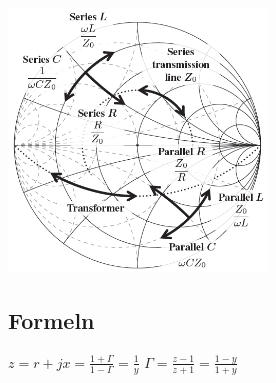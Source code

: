	\\
	\includegraphics[height=7cm]{./bilder/smith_anpassung.png}
	
\subsection{Formeln}
	$z=r+jx=\frac{1+\Gamma}{1-\Gamma}=\frac{1}{y}$ \qquad
	$\Gamma=\frac{z-1}{z+1}=\frac{1-y}{1+y}$
	
